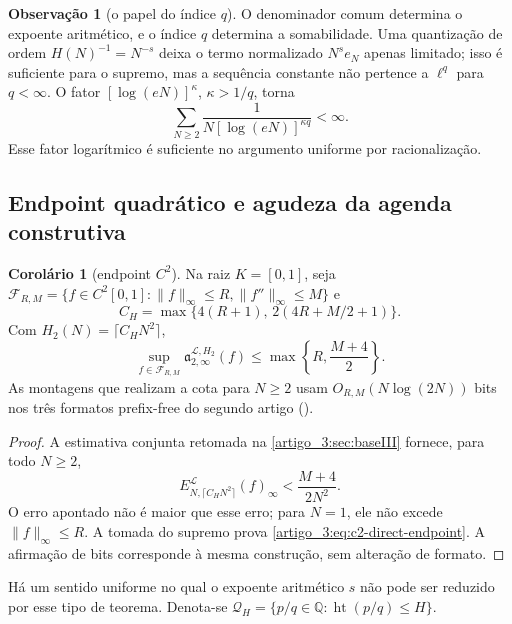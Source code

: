 \documentclass[12pt,a4paper]{article}
\makeatletter
\theoremstyle{preciso}
\theoremstyle{definition}
\newcommand{\Library}{\mathcal{L}}
\newcommand{\height}{\operatorname{ht}}
\theoremstyle{preciso}
\theoremstyle{preciso}
\theoremstyle{preciso}
\theoremstyle{preciso}
\newtheorem{corollary}[teorema]{Corolário}
\theoremstyle{definition}
\theoremstyle{preciso}
\theoremstyle{definition}
\newtheorem{remark}[teorema]{Observação}
\theoremstyle{preciso}
\theoremstyle{preciso}
\theoremstyle{definition}
\newcommand{\abntlookup}[2]{\ifcsname ab#1@#2\endcsname\csname ab#1@#2\endcsname\else\textbf{??}\PackageWarning{abnt}{Citacao indefinida: #2}\fi}
\newcommand{\abntpar}[1]{\hyperlink{bib:#1}{\abntlookup{U}{#1}, \abntlookup{Y}{#1}}}
\newcommand{\abntsep}{}
\newcommand{\abntpitem}[1]{\abntsep\renewcommand{\abntsep}{; }\abntpar{#1}}
\newcommand{\citep}[2][]{\begingroup\renewcommand{\abntsep}{}(\forcsvlist{\abntpitem}{#2}\ifblank{#1}{}{, #1})\endgroup}
\makeatother
\begin{document}
\begin{remark}[o papel do índice $q$]\label{map:artigo_3:4.4}
\label{artigo_3:rem:q-height-role}
O denominador comum determina o expoente aritmético, e o índice $q$ determina
a somabilidade. Uma quantização de ordem
$H(N)^{-1}=N^{-s}$ deixa o termo normalizado $N^se_N$ apenas limitado; isso
é suficiente para o supremo, mas a sequência constante não pertence a
$\ell^q$ para $q<\infty$. O fator $[\log(eN)]^\kappa$, $\kappa>1/q$, torna
\[
 \sum_{N\ge2}\frac1{N[\log(eN)]^{\kappa q}}<\infty.
\]
Esse fator logarítmico é suficiente no argumento uniforme por
racionalização.
\end{remark}

\subsection{Endpoint quadrático e agudeza da agenda construtiva}

\begin{corollary}[endpoint $C^2$]\label{map:artigo_3:4.5}
\label{artigo_3:cor:c2-direct-endpoint}
Na raiz $K=[0,1]$, seja
$\mathcal F_{R,M}=\{f\in C^2[0,1]:\|f\|_\infty\le R,
\|f''\|_\infty\le M\}$ e
\[
 C_H=\max\{4(R+1),\,2(4R+M/2+1)\}.
\]
Com $H_2(N)=\lceil C_HN^2\rceil$,
\begin{equation}
 \sup_{f\in\mathcal F_{R,M}}
 \mathfrak a_{2,\infty}^{\Library,H_2}(f)
 \le\max\left\{R,\frac{M+4}{2}\right\}.
 \label{artigo_3:eq:c2-direct-endpoint}
\end{equation}
As montagens que realizam a cota para $N\ge2$ usam
$O_{R,M}(N\log(2N))$ bits nos três formatos prefix-free do
segundo artigo \citep{artigo_2-oliveiraII}.
\end{corollary}

\begin{proof}
A estimativa conjunta retomada na \cref{artigo_3:sec:baseIII} fornece, para todo $N\ge2$,
\[
 E_{N,\lceil C_HN^2\rceil}^{\Library}(f)_\infty
 <\frac{M+4}{2N^2}.
\]
O erro apontado não é maior que esse erro; para $N=1$, ele não excede
$\|f\|_\infty\le R$. A tomada do supremo prova
\eqref{artigo_3:eq:c2-direct-endpoint}. A afirmação de bits corresponde à mesma construção,
sem alteração de formato.
\end{proof}

Há um sentido uniforme no qual o expoente aritmético $s$ não pode ser
reduzido por esse tipo de teorema. Denota-se
$\mathcal Q_H=\{p/q\in\mathbb Q:\height(p/q)\le H\}$.
\end{document}
